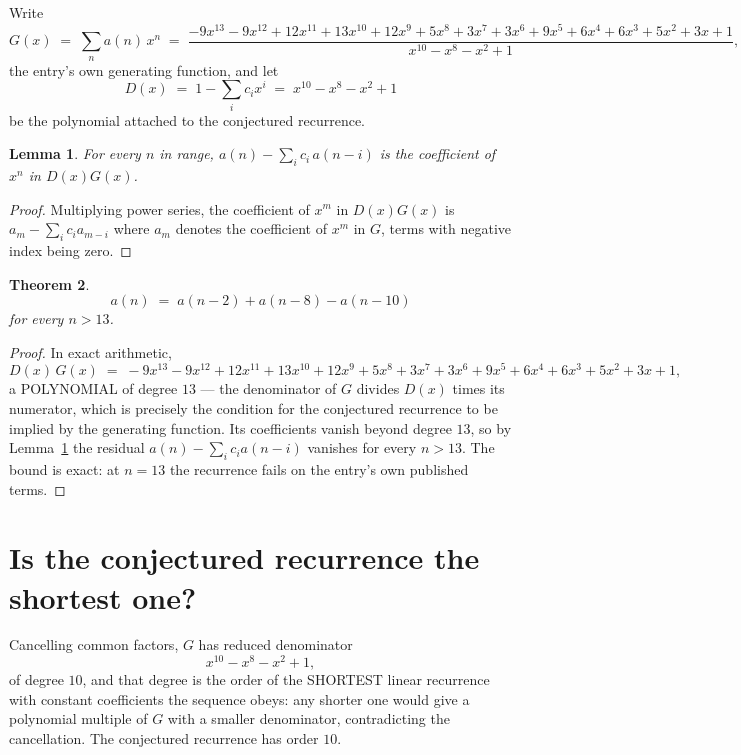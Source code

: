 \documentclass[11pt,a4paper]{article}
\theoremstyle{plain}
\newtheorem{theorem}{Theorem}
\newtheorem{lemma}[theorem]{Lemma}
\theoremstyle{definition}
\begin{document}
Write
\[
G(x)\;=\;\sum_{n}a(n)\,x^{n}\;=\;\frac{- 9 x^{13} - 9 x^{12} + 12 x^{11} + 13 x^{10} + 12 x^{9} + 5 x^{8} + 3 x^{7} + 3 x^{6} + 9 x^{5} + 6 x^{4} + 6 x^{3} + 5 x^{2} + 3 x + 1}{x^{10} - x^{8} - x^{2} + 1},
\]
the entry's own generating function, and let
\[
D(x)\;=\;1-\sum_i c_i x^{i}\;=\;x^{10} - x^{8} - x^{2} + 1
\]
be the polynomial attached to the conjectured recurrence.

\begin{lemma}\label{lem:key}
For every $n$ in range, $a(n)-\sum_i c_i\,a(n-i)$ is the coefficient of $x^{n}$ in
$D(x)G(x)$.
\end{lemma}

\begin{proof}
Multiplying power series, the coefficient of $x^{m}$ in $D(x)G(x)$ is
$a_m-\sum_i c_i a_{m-i}$ where $a_m$ denotes the coefficient of $x^{m}$ in $G$, terms with
negative index being zero.
\end{proof}

\begin{theorem}
\[
a(n)\;=\;a(n-2) + a(n-8) - a(n-10)
\]
for every $n>13$.
\end{theorem}

\begin{proof}
In exact arithmetic,
\[
D(x)\,G(x)\;=\;- 9 x^{13} - 9 x^{12} + 12 x^{11} + 13 x^{10} + 12 x^{9} + 5 x^{8} + 3 x^{7} + 3 x^{6} + 9 x^{5} + 6 x^{4} + 6 x^{3} + 5 x^{2} + 3 x + 1,
\]
a POLYNOMIAL of degree $13$ --- the denominator of $G$ divides $D(x)$ times its numerator,
which is precisely the condition for the conjectured recurrence to be implied by the
generating function. Its coefficients vanish beyond degree $13$, so by
Lemma~\ref{lem:key} the residual $a(n)-\sum_ic_ia(n-i)$ vanishes for every
$n>13$. The bound is exact: at $n=13$ the recurrence fails on the entry's own published terms.
\end{proof}

\section{Is the conjectured recurrence the shortest one?}

Cancelling common factors, $G$ has reduced denominator
\[
x^{10} - x^{8} - x^{2} + 1,
\]
of degree $10$, and that degree is the order of the SHORTEST linear recurrence with
constant coefficients the sequence obeys: any shorter one would give a polynomial multiple of
$G$ with a smaller denominator, contradicting the cancellation. The conjectured recurrence has
order $10$.
\end{document}
